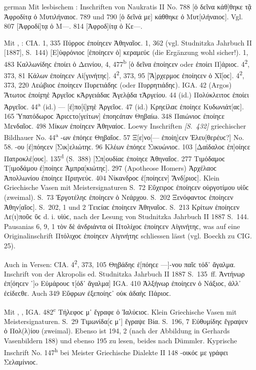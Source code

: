 \begin{otherlanguage*}{german}
Mit lesbischem : Inschriften von Naukratis II No. 788 [ὁ δεῖνα κάθ]θη\-κε τᾷ Ἀφροδίτᾳ ὀ Μυτιλήναιοϲ. 789 und 790 [ὁ δεῖνά με] κάθθηκε ὀ Μυ\-τ[ι\-λή\-ναι\-οϲ]. Vgl. 807 [Ἀφροδί]τᾳ ὁ Μ—. 814 [Ἀφροδ]ίτᾳ ὁ Κε—.

Mit , : CΙΑ. 1, 335 Πύρροϲ ἐποίηϲεν Ἀθηναῖοϲ. 1, 362 (vgl. Studnitzka Jahrbuch II [1887], S.~144) [Ε]ὐφρόνιοϲ [ἐποίηϲεν ὁ] κεραμεύϲ (die Ergänzung wohl sicher!). 1, 483 Καλλωνίδηϲ ἐποίει ὁ Δεινίου, 4, 477\textsuperscript{b} [ὁ δεῖνα ἐποίηϲεν oder ἐποίει Π]άριοϲ. 4\textsuperscript{2}, 373, 81 Κάλων ἐποίηϲεν Αἱ[γινήτηϲ]. 4\textsuperscript{2}, 373, 95 [Ἄ]ρχερμοϲ ἐποίηϲεν ὁ Χῖ[οϲ]. 4\textsuperscript{2}, 373, 220 Λεώβιοϲ ἐποίηϲεν Πυρετιάδηϲ (oder Πυρρητιάδηϲ). IGA. 42 (Argos) Ἄτωτοϲ ἐποίϝηἑ Ἀργεῖοϲ κἈργειάδαϲ Ἁγελᾴδα τἈργείου. 44 (id.) Πολύκλειτοϲ ἐποίει Ἀργεῖοϲ. 44\textsuperscript{a} (id.) — [ἐ]πο[ί]ϝηἑ Ἀργεῖοϲ. 47 (id.) Κρηϲίλαϲ ἐποίηϲε Κυδωνιάτ[αϲ]. 165 Ὑπατόδωροϲ Ἀριϲϲτο[γείτων] ἐποηϲάταν Θηβαίω. 348 Παιώνιοϲ ἐποίηϲε Μενδαῖοϲ. 498 Μίκων ἐποίηϲεν Ἀθη\-ναί\-οϲ. Loewy Inschriften \hypertarget{p432}{\emph{[S.~432]}}\label{p432} griechischer Bildhauer No. 44\textsuperscript{a} -ων ἐπόηϲε Θηβαῖοϲ. 57 Ξ[ε]νο[— ἐποίη]ϲεν Ἐλευ[θερέυϲ?] No. 58. -ου [ἐ]πόηϲεν [Σικ]ε\-λι\-ώ\-τηϲ. 96 Κλέων ἐπόηϲε Σικυώνιοϲ. 103 [Δαίδαλοϲ ἐπ]οίηϲε Πατροκλέ[ουϲ]. 135\textsuperscript{d} (S.~388) [Σπ]ουδίαϲ ἐποίηϲε Ἀθηναῖοϲ. 277 Τιμόδαμοϲ Τ[ιμοδάμου ἐ]ποίηϲε Ἀμπρα[κιώτηϲ]. 297 (Apotheose Homers) Ἀρχέλαοϲ Ἀπολλωνίου ἐποίηϲε Πρι\-η\-νεύϲ. 404 Νίκανδροϲ ἐ[ποίηϲεν] Ἄνδ[ριοϲ]. Klein Griechische Vasen mit Meistersignaturen S.~72 Εὔχειροϲ ἐποίηϲεν οὑργοτίμου υἱὕϲ (zweimal). S.~73 Ἐργοτέληϲ ἐποίηϲεν ὁ Νεάρχου. S.~202 Ξενόφαντοϲ ἐποίηϲεν Ἀθην[αῖοϲ]. S.~202, 1 und 2 Τειϲίαϲ ἐποίηϲεν Ἁθηναῖοϲ. S.~213 Κρίτων ἐποίηϲεν Λε(ι)ποῦϲ ὕϲ d. i. υἱύϲ, nach der Lesung von Studnitzka Jahrbuch II 1887 S.~144. Pausanias 6, 9, 1 τὸν δὲ ἀνδριάντα οἱ Πτολίχοϲ ἐποίηϲεν Αἰγινήτηϲ, was auf eine Originalinschrift Πτόλιχοϲ ἐποίηϲεν Αἰγινήτηϲ schliessen lässt (vgl. Boeckh zu CIG. 25).

Auch in Versen: CIA. 4\textsuperscript{2}, 373, 105 Θηβάδηϲ ἐ[πόηϲε —]-νου παῖϲ τόδ᾽ ἄγαλμα. Inschrift von der Akropolis ed. Studnitzka Jahrbuch II 1887 S.~135~ff. Ἀντήνωρ ἐπ[όηϲεν ῾]o Εὐμάρουϲ τ[όδ᾽ ἄγαλμα] IGA. 410 Ἀλξήνωρ ἐποίηϲεν ὁ Νάξιοϲ, ἀλλ᾽ ἐϲίδεϲθε. Auch 349 Εὔφρων ἐξεποίηϲ᾽ οὐκ ἀδαὴϲ Πάριοϲ.

Mit , ,  IGA. 482\textsuperscript{c} Τήλεφοϲ μ᾽ ἔγραφε ὁ Ἰαλύϲιοϲ. Klein Griechische Vasen mit Meistersignaturen. S.~29 Τιμωνίδα[ϲ μ᾽] ἔγραψε Βία. S.~196, 7 Εὐθυμίδηϲ ἔγραψεν ὁ Πολ(λ)ίου (zweimal). Ebenso ist 194, 2 (nach der Abbildung in Gerhards Vasenbildern 188) und ebenso 195 zu lesen, beides nach Dümmler. Kyprische Inschrift No. 147\textsuperscript{h} bei Meister Griechische Dialekte II 148 -οικόϲ με γράφει Σελαμίνιοϲ.


\end{otherlanguage*}
